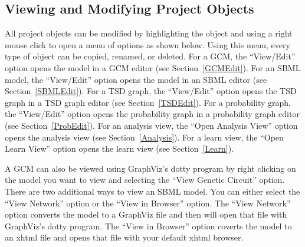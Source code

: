 \documentclass[titlepage,11pt]{article}
\begin{document}
\subsection{Viewing and Modifying Project Objects}

\noindent
All project objects can be modified by highlighting the object
and using a right mouse click to open a menu of options as shown
below. Using this menu, every type of object can be copied, renamed, or
deleted. For a GCM, the ``View/Edit'' option opens the
model in a GCM editor (see Section~\ref{GCMEdit}). For an SBML model,
the ``View/Edit'' option opens the model in an SBML editor 
(see Section~\ref{SBMLEdit}). For a TSD graph, the ``View/Edit'' 
option opens the TSD graph in a TSD graph editor (see Section~\ref{TSDEdit}). 
For a probability graph, the ``View/Edit'' option opens
the probability graph in a probability graph editor 
(see Section~\ref{ProbEdit}). 
For an analysis view, the ``Open Analysis View'' option opens the
analysis view (see Section~\ref{Analysis}). For a learn view, the
``Open Learn View'' option opens the learn view (see Section~\ref{Learn}).

A GCM can also be viewed using 
GraphViz's
dotty program  by right clicking on the model you want to view and
selecting the ``View Genetic Circuit'' option. 
There are two additional ways to view an SBML model. You
can either select the ``View Network'' option or the
``View in Browser'' option.  The ``View Network''
option converts the model to a GraphViz file and then will open that 
file with GraphViz's dotty program.  The ``View in Browser'' option 
coverts the model to an xhtml file and opens that file with your 
default xhtml browser.
\end{document}
